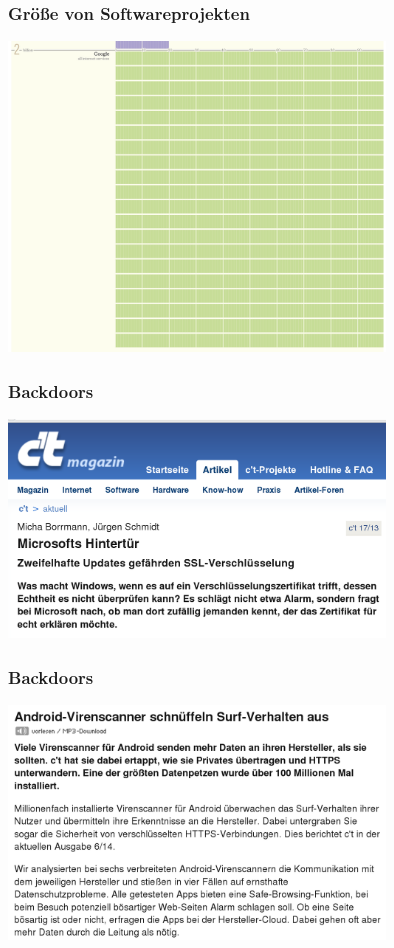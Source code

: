 \documentclass[12pt]{beamer}
\begin{document}
\begin{frame}
  \frametitle{Größe von Softwareprojekten}
  \begin{center}
    \includegraphics[width=10cm]{img/linesofcode-google.png}
  \par\end{center}
\end{frame}

\begin{frame}
  \frametitle{Backdoors}
  \begin{center}
    \includegraphics[width=10cm]{img/backdoor-windows}
  \par\end{center}
\end{frame}

\begin{frame}
  \frametitle{Backdoors}
  \begin{center}
    \includegraphics[width=10cm]{img/backdoor-av}
  \par\end{center}
\end{frame}
\end{document}
